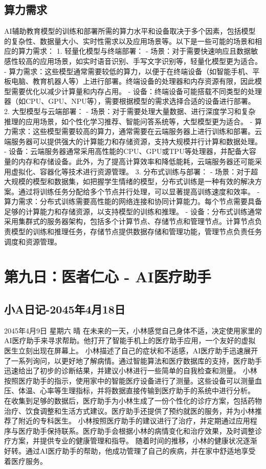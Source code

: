 \subsection{算力需求}
AI辅助教育模型的训练和部署所需的算力水平和设备取决于多个因素，包括模型的复杂性、数据量大小、实时性需求以及应用场景等。以下是一些可能的场景和相应的算力需求：
1. 轻量化模型与终端部署：
  - 场景：对于需要快速响应且数据敏感性较高的应用场景，如实时语音识别、手写文字识别等，轻量化模型更为适合。
  - 算力需求：这些模型通常需要较低的算力，以便于在终端设备（如智能手机、平板电脑、教育机器人等）上进行部署。终端设备的处理器和内存资源有限，因此模型需要优化以减少计算量和内存占用。
  - 设备：终端设备可能搭载不同类型的处理器（如CPU、GPU、NPU等），需要根据模型的需求选择合适的设备进行部署。
2. 大型模型与云端部署：
  - 场景：对于需要处理大量数据、进行深度学习和复杂推理的应用场景，如个性化学习推荐、智能问答系统等，大型模型更为适合。
  - 算力需求：这些模型需要较高的算力，通常需要在云端服务器上进行训练和部署。云端服务器可以提供强大的计算能力和存储资源，支持大规模并行计算和数据处理。
  - 设备：云端服务器通常采用高性能的CPU、GPU或TPU等处理器，并配备大容量的内存和存储设备。此外，为了提高计算效率和降低能耗，云端服务器还可能采用虚拟化、容器化等技术进行资源管理。
3. 分布式训练与部署：
  - 场景：对于超大规模的模型和数据集，如把握学生情绪的模型，分布式训练是一种有效的解决方案。通过将训练任务分配给多个节点并行处理，可以显著提高训练速度和效率。
  - 算力需求：分布式训练需要高性能的网络连接和协同计算能力。每个节点需要具备足够的计算能力和存储资源，以支持模型的训练和推理。
  - 设备：分布式训练通常采用集群式的服务器架构，包括多个计算节点、存储节点和管理节点。计算节点负责模型的训练和推理任务，存储节点提供数据存储和管理功能，管理节点负责任务调度和资源管理。
\section{第九日：医者仁心 - AI医疗助手}
\subsection{小A日记-2045年4月18日}
2045年4月9日 星期六 晴
在未来的一天，小林感觉自己身体不适，决定使用家里的AI医疗助手来寻求帮助。他打开了智能手机上的医疗助手应用，一个友好的虚拟医生立刻出现在屏幕上。
小林描述了自己的症状和不适感，AI医疗助手迅速展开了一系列询问，以更好地了解病情。通过智能算法和医疗数据库的支持，医疗助手迅速给出了初步的诊断结果，并建议小林进行一些简单的自我检查和测量。
小林按照医疗助手的指示，使用家中的智能医疗设备进行了测量。这些设备可以测量血压、体温、心率等生理指标，并将数据直接传输到医疗助手的系统中进行分析。
在收集到足够的数据后，医疗助手为小林生成了一份个性化的诊疗方案，包括药物治疗、饮食调整和生活方式建议。医疗助手还提供了预约就医的服务，并为小林推荐了附近的专科医生。
小林按照医疗助手的建议进行了治疗，并定期通过应用程序与医疗助手保持联系。医疗助手会根据小林的病情变化和治疗效果，及时调整诊疗方案，并提供专业的健康管理和指导。
随着时间的推移，小林的健康状况逐渐好转。通过AI医疗助手的帮助，他成功管理了自己的疾病，并在家中舒适地享受着医疗服务。
